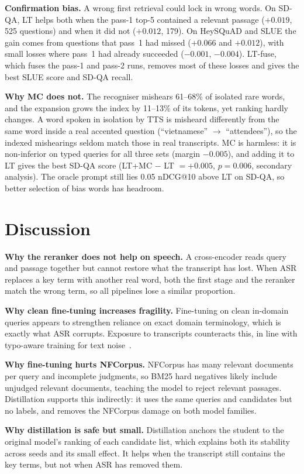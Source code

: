 \documentclass[conference]{IEEEtran}
\newcommand{\ra}{$\rightarrow$}
\begin{document}
\textbf{Confirmation bias.} A wrong first retrieval could lock in wrong words. On SD-QA, LT helps both when the pass-1 top-5 contained a relevant passage ($+0.019$, 525 questions) and when it did not ($+0.012$, 179). On HeySQuAD and SLUE the gain comes from questions that pass~1 had missed ($+0.066$ and $+0.012$), with small losses where pass~1 had already succeeded ($-0.001$, $-0.004$). LT-fuse, which fuses the pass-1 and pass-2 runs, removes most of these losses and gives the best SLUE score and SD-QA recall.

\textbf{Why MC does not.} The recogniser mishears 61--68\% of isolated rare words, and the expansion grows the index by 11--13\% of its tokens, yet ranking hardly changes. A word spoken in isolation by TTS is misheard differently from the same word inside a real accented question (``vietnamese'' \ra{} ``attendees''), so the indexed mishearings seldom match those in real transcripts. MC is harmless: it is non-inferior on typed queries for all three sets (margin $-0.005$), and adding it to LT gives the best SD-QA score (LT+MC $-$ LT $= +0.005$, $p=0.006$, secondary analysis). The oracle prompt still lies 0.05 nDCG@10 above LT on SD-QA, so better selection of bias words has headroom.

\section{Discussion}
\textbf{Why the reranker does not help on speech.} A cross-encoder reads query and passage together but cannot restore what the transcript has lost. When ASR replaces a key term with another real word, both the first stage and the reranker match the wrong term, so all pipelines lose a similar proportion.

\textbf{Why clean fine-tuning increases fragility.} Fine-tuning on clean in-domain queries appears to strengthen reliance on exact domain terminology, which is exactly what ASR corrupts. Exposure to transcripts counteracts this, in line with typo-aware training for text noise~\cite{zhuang21}.

\textbf{Why fine-tuning hurts NFCorpus.} NFCorpus has many relevant documents per query and incomplete judgments, so BM25 hard negatives likely include unjudged relevant documents, teaching the model to reject relevant passages. Distillation supports this indirectly: it uses the same queries and candidates but no labels, and removes the NFCorpus damage on both model families.

\textbf{Why distillation is safe but small.} Distillation anchors the student to the original model's ranking of each candidate list, which explains both its stability across seeds and its small effect. It helps when the transcript still contains the key terms, but not when ASR has removed them.
\end{document}
